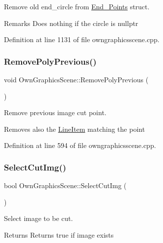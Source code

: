 Remove old end\+\_\+circle from \mbox{\hyperlink{structEnd__Points}{End\+\_\+\+Points}} struct. 

\begin{DoxyRemark}{Remarks}
Does nothing if the circle is nullptr 
\end{DoxyRemark}


Definition at line 1131 of file owngraphicsscene.\+cpp.

\mbox{\label{classOwnGraphicsScene_a4976a8e6f682612acd3e23b6c98bd8d8}} 
\subsubsection{\texorpdfstring{Remove\+Poly\+Previous()}{RemovePolyPrevious()}}
{\footnotesize\ttfamily void Own\+Graphics\+Scene\+::\+Remove\+Poly\+Previous (\begin{DoxyParamCaption}{ }\end{DoxyParamCaption})}



Remove previous image cut point. 

Removes also the \mbox{\hyperlink{classLineItem}{Line\+Item}} matching the point 

Definition at line 594 of file owngraphicsscene.\+cpp.

\mbox{\label{classOwnGraphicsScene_ae79aa179ce90ab26f06d7d17eed96b93}} 
\subsubsection{\texorpdfstring{Select\+Cut\+Img()}{SelectCutImg()}}
{\footnotesize\ttfamily bool Own\+Graphics\+Scene\+::\+Select\+Cut\+Img (\begin{DoxyParamCaption}{ }\end{DoxyParamCaption})}



Select image to be cut. 

\begin{DoxyReturn}{Returns}
Returns true if image exists 
\end{DoxyReturn}


